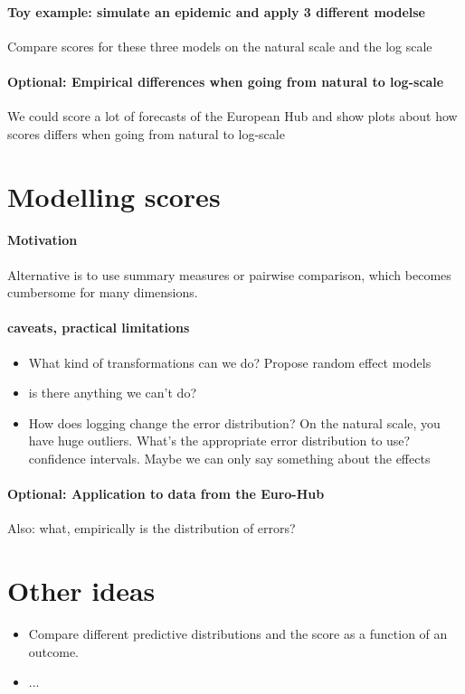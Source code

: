 \documentclass{article}
\begin{document}
\paragraph{Toy example: simulate an epidemic and apply 3 different modelse} Compare scores for these three models on the natural scale and the log scale

\paragraph{Optional: Empirical differences when going from natural to log-scale} 
We could score a lot of forecasts of the European Hub and show plots about how scores differs when going from natural to log-scale


\section{Modelling scores}
\paragraph{Motivation} Alternative is to use summary measures or pairwise comparison, which becomes cumbersome for many dimensions. 

\paragraph{caveats, practical limitations}
\begin{itemize}
    \item What kind of transformations can we do? Propose random effect models
    \item is there anything we can't do? 
    \item How does logging change the error distribution? On the natural scale, you have huge outliers. What's the appropriate error distribution to use? confidence intervals. Maybe we can only say something about the effects
\end{itemize}


\paragraph{Optional: Application to data from the Euro-Hub}
Also: what, empirically is the distribution of errors? 

\section{Other ideas}
\begin{itemize}
    \item Compare different predictive distributions and the score as a function of an outcome.
    \item ...
\end{itemize}
\end{document}
